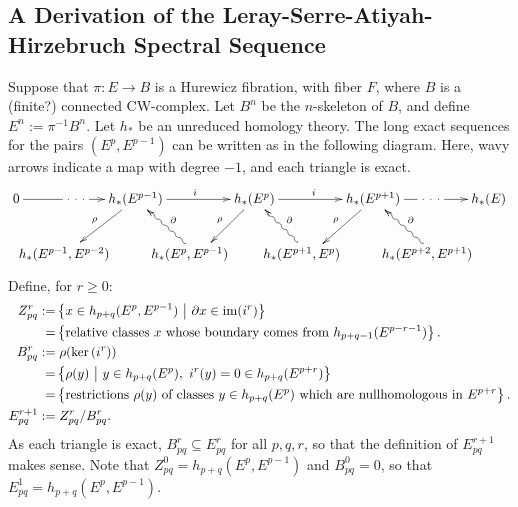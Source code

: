 \documentclass[11pt]{article}
\newcommand{\myheading}[1]
{{\noindent\Large #1}

}
\newcommand{\shrt}[1]{\makebox[0cm]{\ensuremath{#1}}}
\renewcommand{\myheading}[1]{\subsection{#1}}
\begin{document}
\begin{Leray Serre Hirzebruch SS}
\myheading{A Derivation of the Leray-Serre-Atiyah-Hirzebruch Spectral Sequence}
Suppose that $\pi:E\to B$ is a Hurewicz fibration, with fiber $F$, where $B$ is a (finite?) connected CW-complex. Let $B^n$ be the $n$-skeleton of $B$, and define $E^n:=\pi^{-1}B^n$. Let $h_*$ be an unreduced homology theory. The long exact sequences for the pairs $(E^p,E^{p-1})$ can be written as in the following diagram. Here, wavy arrows indicate a map with degree $-1$, and each triangle is exact.
\[\xymatrix@C=.5cm{
0\ar[rr]|{\ \cdot\ \cdot\ \cdot\ }&&h_*(E^{p-1})\ar[rr]^i\ar[ld]_\rho &&h_*(E^{p})\ar[rr]^i \ar[ld]_\rho&&h_*(E^{p+1})\ar[ld]_\rho
\ar[rr]|{\ \cdot\ \cdot\ \cdot\ }&&h_*(E)\\
&\ \ \ \ \shrt{h_*(E^{p-1},E^{p-2})}\phantom{\binom{5}{3}}&&
\shrt{h_*(E^{p},E^{p-1})}\phantom{\binom{5}{3}}\ar@{~>}[lu]_\partial&&
\shrt{h_*(E^{p+1},E^{p})}\phantom{\binom{5}{3}}\ar@{~>}[lu]_\partial&&
\shrt{h_*(E^{p+2},E^{p+1})}\phantom{\binom{5}{3}}\ar@{~>}[lu]_\partial
}\]
Define, for $r\geq0$:
\begin{alignat*}{2}
Z_{pq}^r:=&\left\{x\in h_{p+q}(E^p,E^{p-1})\ \middle|\ \partial x\in\im(i^{r})\right\}\\
=&\left\{\text{relative classes $x$ whose boundary comes from $h_{p+q-1}(E^{p-r-1})$}\right\}.\\
B_{pq}^r:=&\left.\rho(\ker(i^r))\right.\\
=&\left\{\rho(y)\ \middle|\ y\in h_{p+q}(E^p),\ i^r(y)=0\in h_{p+q}(E^{p+r})\right\}\\
=&\left\{\text{restrictions $\rho(y)$ of classes $y\in h_{p+q}(E^p)$ which are nullhomologous in $E^{p+r}$}\right\}.\\
E_{pq}^{r+1}:=&\left.Z_{pq}^r/B_{pq}^r.\right.%
\end{alignat*}
As each triangle is exact, $B_{pq}^r\subseteq E_{pq}^r$ for all $p,q,r$, so that the definition of $E_{pq}^{r+1}$ makes sense.
Note that $Z_{pq}^0=h_{p+q}(E^p,E^{p-1})$ and $B_{pq}^0=0$, so that $E_{pq}^1=h_{p+q}(E^p,E^{p-1})$.


\end{Leray Serre Hirzebruch SS}
\end{document}
